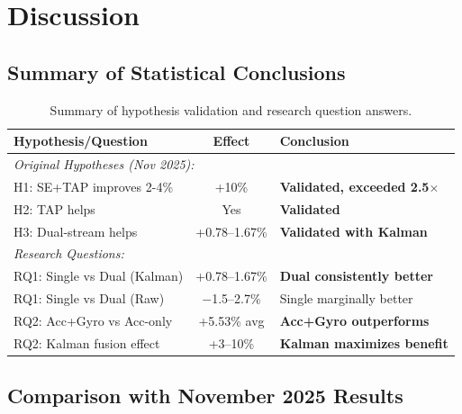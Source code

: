 \documentclass{article}
\begin{document}
\section{Discussion}

\subsection{Summary of Statistical Conclusions}

\begin{table}[htbp]
    \centering
    \caption{Summary of hypothesis validation and research question answers.}
    \label{tab:summary}
    \begin{tabular}{lcp{5cm}}
        \toprule
        \textbf{Hypothesis/Question} & \textbf{Effect} & \textbf{Conclusion} \\
        \midrule
        \multicolumn{3}{l}{\textit{Original Hypotheses (Nov 2025):}} \\
        H1: SE+TAP improves 2-4\% & +10\% & \textbf{Validated, exceeded 2.5$\times$} \\
        H2: TAP helps & Yes & \textbf{Validated} \\
        H3: Dual-stream helps & +0.78--1.67\% & \textbf{Validated with Kalman} \\
        \midrule
        \multicolumn{3}{l}{\textit{Research Questions:}} \\
        RQ1: Single vs Dual (Kalman) & +0.78--1.67\% & \textbf{Dual consistently better} \\
        RQ1: Single vs Dual (Raw) & $-$1.5--2.7\% & Single marginally better \\
        RQ2: Acc+Gyro vs Acc-only & +5.53\% avg & \textbf{Acc+Gyro outperforms} \\
        RQ2: Kalman fusion effect & +3--10\% & \textbf{Kalman maximizes benefit} \\
        \bottomrule
    \end{tabular}
\end{table}

\subsection{Comparison with November 2025 Results}
\end{document}
